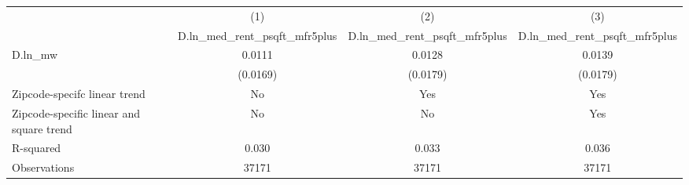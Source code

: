 {
\def\sym#1{\ifmmode^{#1}\else\(^{#1}\)\fi}
\begin{tabular}{l*{3}{c}}
\hline\hline
          &\multicolumn{1}{c}{(1)}&\multicolumn{1}{c}{(2)}&\multicolumn{1}{c}{(3)}\\
          &\multicolumn{1}{c}{D.ln\_med\_rent\_psqft\_mfr5plus}&\multicolumn{1}{c}{D.ln\_med\_rent\_psqft\_mfr5plus}&\multicolumn{1}{c}{D.ln\_med\_rent\_psqft\_mfr5plus}\\
\hline
D.ln\_mw   &   0.0111         &   0.0128         &   0.0139         \\
          & (0.0169)         & (0.0179)         & (0.0179)         \\
\hline
Zipcode-specifc linear trend&       No         &      Yes         &      Yes         \\
Zipcode-specific linear and square trend&       No         &       No         &      Yes         \\
R-squared &    0.030         &    0.033         &    0.036         \\
Observations&    37171         &    37171         &    37171         \\
\hline\hline
\end{tabular}
}
